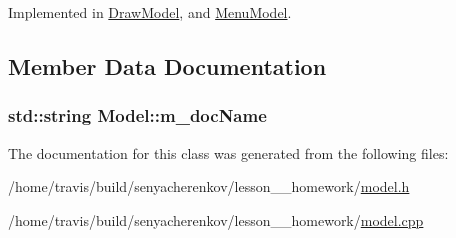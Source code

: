 Implemented in \hyperlink{classDrawModel_a64d70716532d50216910f4c37b75da32}{Draw\-Model}, and \hyperlink{classMenuModel_ab49130e41f188e5c632c4681961d9415}{Menu\-Model}.



\subsection{Member Data Documentation}
\hypertarget{classModel_a4f8aa4311a54d069a54dc2626461163f}{
\subsubsection[{m\-\_\-doc\-Name}]{\setlength{\rightskip}{0pt plus 5cm}std\-::string Model\-::m\-\_\-doc\-Name\hspace{0.3cm}{\ttfamily [protected]}}}\label{classModel_a4f8aa4311a54d069a54dc2626461163f}


The documentation for this class was generated from the following files\-:\begin{DoxyCompactItemize}
\item 
/home/travis/build/senyacherenkov/lesson\-\_\-\_\-homework/\hyperlink{model_8h}{model.\-h}\item 
/home/travis/build/senyacherenkov/lesson\-\_\-\_\-homework/\hyperlink{model_8cpp}{model.\-cpp}\end{DoxyCompactItemize}
